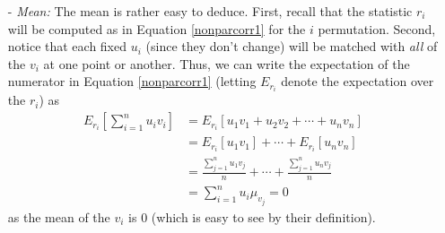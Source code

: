 \documentclass[a4paper,12pt]{scrartcl}
\begin{document}
\begin{itemize}
   \item[-] {\sl Mean:} The mean is rather easy to deduce. 
      First, recall 
      that the statistic $r_i$ will be computed as in 
      Equation \ref{nonparcorr1} for the $i$ permutation. Second, 
      notice that each fixed $u_i$ (since they don't change)
      will be matched with \emph{all} of the $v_i$ at one point or
      another.  Thus, we can write the expectation of the 
      numerator in Equation \ref{nonparcorr1} (letting $E_{r_i}$ denote
      the expectation over the $r_i$) as 
      \begin{align*}
	 E_{r_i}\left[\sum_{i=1}^n u_i v_i\right] &=  
	    E_{r_i}\left[u_1 v_1 + u_2 v_2 + \cdots + u_n v_n\right]\\
	    &= E_{r_i}\left[u_1 v_1\right]+\cdots
	       + E_{r_i}\left[ u_n v_n\right]\\
	 &= \frac{\sum_{j=1}^n u_1 v_j}{n} + \cdots 
	 + \frac{\sum_{j=1}^n u_n v_j}{n}\\
	 &= \sum_{i=1}^n u_i \mu_{v_j}= 0 
      \end{align*}
      as the mean of the $v_i$ is 0 (which is easy to see by their
      definition).


\end{itemize}
\end{document}
